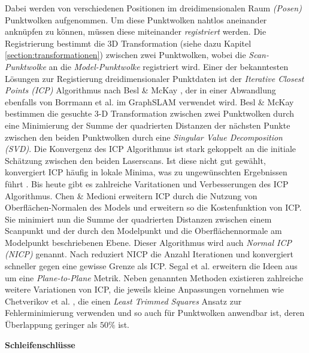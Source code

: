 Dabei werden von verschiedenen Positionen im dreidimensionalen Raum \emph{(Posen)} Punktwolken aufgenommen. Um diese Punktwolken nahtlos aneinander anknüpfen zu können, müssen diese miteinander \emph{registriert} werden. Die Registrierung bestimmt die 3D Transformation (siehe dazu Kapitel \ref{section:transformationen}) zwischen zwei Punktwolken, wobei die \emph{Scan-Punktwolke} an die \emph{Model-Punktwolke} registriert wird.
Einer der bekanntesten Lösungen zur Registierung dreidimensionaler Punktdaten ist der \emph{Iterative Closest Points (ICP)} Algorithmus nach Besl \& McKay \cite{besl1992method}, der in einer Abwandlung ebenfalls von Borrmann et al. im GraphSLAM \cite{borrmann2008globally} verwendet wird.
Besl \& McKay \cite{besl1992method} bestimmen die gesuchte 3-D Transformation zwischen zwei Punktwolken durch eine Minimierung der Summe der quadrierten Distanzen der nächsten Punkte zwischen den beiden Punktwolken durch eine \emph{Singular Value Decomposition (SVD)}.
Die Konvergenz des ICP Algorithmus ist stark gekoppelt an die initiale Schätzung zwischen den beiden Laserscans. Ist diese nicht gut gewählt, konvergiert ICP häufig in lokale Minima, was zu ungewünschten Ergebnissen führt \cite{he2017iterative}. 
Bis heute gibt es zahlreiche Varitationen und Verbesserungen des ICP Algorithmus.
Chen \& Medioni \cite{chen1992object} erweitern ICP durch die Nutzung von Oberflächen-Normalen des Models und erweitern so die Kostenfunktion von ICP. Sie minimiert nun die Summe der quadrierten Distanzen zwischen einem Scanpunkt und der durch den Modelpunkt und die Oberflächennormale am Modelpunkt beschriebenen Ebene. Dieser Algorithmus wird auch \emph{Normal ICP (NICP)} genannt. 
Nach \cite{he2017iterative} reduziert NICP die Anzahl Iterationen und konvergiert schneller  gegen eine gewisse Grenze als ICP.
Segal et al. \cite{segal2009generalized} erweitern die Ideen aus \cite{chen1992object} um eine \emph{Plane-to-Plane} Metrik.
Neben genannten Methoden existieren zahlreiche weitere Variationen von ICP, die jeweils kleine Anpassungen vornehmen wie Chetverikov et al. \cite{chetverikov2005robust}, die einen \emph{Least Trimmed Squares} Ansatz zur Fehlerminimierung verwenden und so auch für Punktwolken anwendbar ist, deren Überlappung geringer als $50\%$ ist.

\textbf{Schleifenschlüsse}

